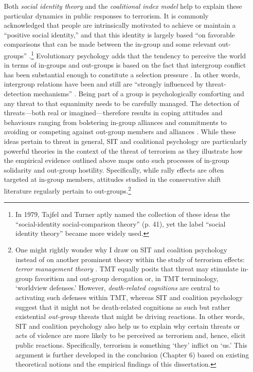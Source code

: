 Both \textit{social identity theory} \citep[SIT;][]{Tajfel1979} and the \textit{coalitional index model} \citep{Boyer2015} help to explain these particular dynamics in public responses to terrorism. It is commonly acknowledged that people are intrinsically motivated to achieve or maintain a ``positive social identity,'' and that this identity is largely based ``on favorable comparisons that can be made between the in-group and some relevant out-groups'' \citep[][p. 40]{Tajfel1979}.\footnote{In 1979, Tajfel and Turner aptly named the collection of these ideas the “social-identity social-comparison theory” (p. 41), yet the label “social identity theory” became more widely used.} Evolutionary psychology adds that the tendency to perceive the world in terms of in-groups and out-groups is based on the fact that intergroup conflict has been substantial enough to constitute a selection pressure \citep{Tooby2010}. In other words, intergroup relations have been and still are ``strongly influenced by threat-detection mechanisms'' \citep[][p. 435]{Boyer2015}. Being part of a group is psychologically comforting and any threat to that equanimity needs to be carefully managed. The detection of threats---both real or imagined---therefore results in coping attitudes and behaviours ranging from bolstering in-group alliances and commitments to avoiding or competing against out-group members and alliances \citep{Boyer2015, Lindner2018}. While these ideas pertain to threat in general, SIT and coalitional psychology are particularly powerful theories in the context of the threat of terrorism as they illustrate how the empirical evidence outlined above maps onto such processes of in-group solidarity and out-group hostility. Specifically, while rally effects are often targeted at in-group members, attitudes studied in the conservative shift literature regularly pertain to out-groups.\footnote{One might rightly wonder why I draw on SIT and coalition psychology instead of on another prominent theory within the study of terrorism effects: \textit{terror management theory }\citep[TMT;][]{Pyszczynski2003, Rosenblatt1989, Greenberg1986}. TMT equally posits that threat may stimulate in-group favoritism and out-group derogation or, in TMT terminology, `worldview defenses.' However, \textit{death-related cognitions} are central to activating such defenses within TMT, whereas SIT and coalition psychology suggest that it might not be death-related cognitions as such but rather existential \textit{out-group} threats that might be driving reactions. In other words, SIT and coalition psychology also help us to explain why certain threats or acts of violence are more likely to be perceived as terrorism and, hence, elicit public reactions. Specifically, terrorism is something `they' inflict on `us.' This argument is further developed in the conclusion (Chapter 6) based on existing theoretical notions and the empirical findings of this dissertation. }




